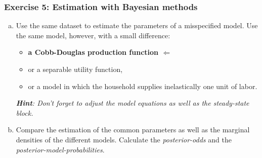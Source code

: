 \documentclass{beamer} %
\newcounter{saveenumi}
\newcommand{\conti}{\setcounter{enumi}{\value{saveenumi}}}
\begin{document}
\begin{frame}\frametitle{Exercise 5: Estimation with Bayesian methods}
  \begin{enumerate}[(a)]\conti
  \item Use the same dataset to estimate the parameters of a misspecified model. Use the same model, however, with a small difference:
      \begin{itemize}
      \item \textbf{a Cobb-Douglas production function $\Leftarrow$}
      \item or a separable utility function,
      \item or a model in which the household supplies inelastically one unit of labor.
      \end{itemize}\emph{\textbf{Hint}: Don't forget to adjust the model equations as well as the steady-state block.}
      \item Compare the estimation of the common parameters as well as the marginal densities of the different models. Calculate the \emph{posterior-odds} and the \emph{posterior-model-probabilities}.

\end{enumerate}
\end{frame}
\end{document}
